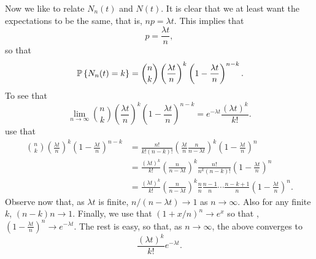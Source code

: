\begin{question}
  \begin{solution} Now we like to relate $N_n(t)$ and $N(t)$. It is
    clear that we at least want the expectations to be the same, that
    is, $np = \lambda t$. This implies that
\begin{equation*}
  p = \frac{\lambda t}n,
\end{equation*}
so that 
\begin{equation*}
  \P{N_n(t) = k} = {n \choose k} \left(\frac{\lambda t}{n}\right)^k \left(1-\frac{\lambda t}n\right)^{n-k}.
\end{equation*}
To see that 
\begin{equation*}\label{eq:52}
  \lim_{n\to\infty} {n \choose k} \left(\frac{\lambda t}{n}\right)^k \left(1-\frac{\lambda t}n\right)^{n-k} = e^{-\lambda t} \frac{(\lambda t)^k}{k!}.
\end{equation*}
use that
    \begin{equation*}
      \begin{split}
      {n \choose k} \left(\frac{\lambda t}{n}\right)^k \left(1-\frac{\lambda t}n\right)^{n-k} 
&= \frac{n!}{k!(n-k)!} \left(\frac{\lambda t}{n}\frac{n}{n-\lambda t}\right)^k \left(1-\frac{\lambda t}n\right)^{n} \\
&= \frac{(\lambda t)^k}{k!} \left(\frac n{n-\lambda t} \right)^k  \frac{n!}{n^k(n-k)!}\left(1-\frac{\lambda t}n\right)^{n}\\
&= \frac{(\lambda t)^k}{k!} \left(\frac n{n-\lambda t} \right)^k \frac{n}{n}\frac{n-1}{n}\cdots\frac{n-k+1}{n} \left(1-\frac{\lambda t}n\right)^{n}.
\end{split}
\end{equation*}
Observe now that, as $\lambda t$ is finite, $n/(n-\lambda t)\to 1$ as
$n\to \infty$. Also for any finite $k$, $(n-k)n\to1$. Finally, we use
that $(1+x/n)^n\to e^{x}$ so that ,
$\left(1-\frac{\lambda t}n\right)^{n} \to e^{-\lambda t}$.  The rest
is easy, so that, as $n\to\infty$,  the above converges to 
\begin{equation*}
\frac{(\lambda t)^k}{k!} e^{-\lambda t}.
\end{equation*}

  \end{solution}
\end{question}


